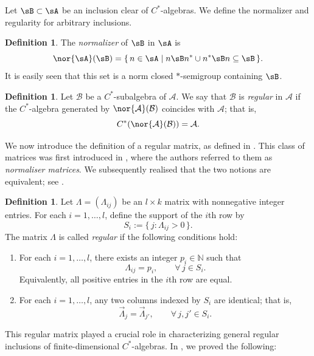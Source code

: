 \documentclass[12pt,a4paper]{amsart}
\theoremstyle{plain}
\theoremstyle{definition}
\newtheorem{definition}[theorem]{Definition}
\theoremstyle{remark}
\numberwithin{equation}{section}
\theoremstyle{ser}
\theoremstyle{serr}
\theoremstyle{ser}
\theoremstyle{ser}
\theoremstyle{collabquestion}
\newcommand{\<}{\langle}
\renewcommand{\>}{\rangle}
\begin{document}
Let $\sB \subset \sA$ be an inclusion clear
of $C^*$-algebras. We define the normalizer and regularity for arbitrary inclusions.

\begin{definition}
The \emph{normalizer} of $\sB$ in $\sA$ is
\[
\nor{\sA}(\sB)
=
\{\, n \in \sA \mid n\sB n^*  \cup n^*\sB n \subseteq \sB \,\}.
\]
It is easily seen that this set is a norm closed $*$-semigroup containing $\sB$.
\end{definition}


\begin{definition}\label{def:regularity}
Let $\mathcal{B}$ be a $C^*$-subalgebra of $\mathcal{A}$. We say that
$\mathcal{B}$ is \emph{regular} in $\mathcal{A}$ if the $C^*$-algebra
generated by $\nor{\mathcal{A}}(\mathcal{B})$ coincides with
$\mathcal{A}$; that is,
\[
C^*(\nor{\mathcal{A}}(\mathcal{B}))=\mathcal{A}.
\]
\end{definition}

We now introduce the definition of a regular matrix, as defined in \cite{BGK2026}. This class of matrices was first introduced in \cite{Bakshi2026}, where the authors referred to them as \emph{normaliser matrices}. We subsequently realised that the two notions are equivalent; see \cite[Proposition 2.9]{BGK2026}.

\begin{definition}\cite[Definition 1.1]{BGK2026}\label{def:regular_mat}
    Let $\Lambda=(\Lambda_{ij})$ be an $l\times k$ matrix with nonnegative integer entries. For each $i=1,\ldots,l$, define the support of the $i$th row by
\[
S_i:=\{\,j:\Lambda_{ij}>0\,\}.
\]
The matrix $\Lambda$ is called \emph{regular} if the following conditions hold:
\begin{enumerate}
    \item[(i)] For each $i=1,\ldots,l$, there exists an integer $p_i\in\mathbb{N}$ such that
    \[
    \Lambda_{ij}=p_i,\qquad \forall\, j\in S_i.
    \]
    Equivalently, all positive entries in the $i$th row are equal.

    \item[(ii)] For each $i=1,\ldots,l$, any two columns indexed by $S_i$ are identical; that is,
    \[
    \vec{\Lambda}_j=\vec{\Lambda}_{j'},\qquad \forall\, j,j'\in S_i.
    \]
\end{enumerate}
\end{definition}
This regular matrix played a crucial role in characterizing general regular inclusions of finite-dimensional $C^*$-algebras. In \cite{BGK2026}, we proved the following:
\end{document}
